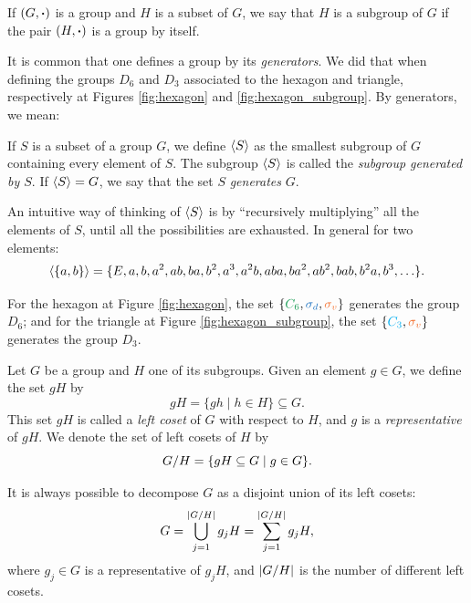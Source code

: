 \begin{definition} \label{def:subgroup}
If $(G, \vdot)$ is a group and $H$ is a subset of $G$, we say that $H$ is a subgroup of $G$ if the pair $(H, \vdot)$ is a group by itself.
\end{definition}

It is common that one defines a group by its \textit{generators}. We did that when defining the groups $D_6$ and $D_3$ associated to the hexagon and triangle, respectively at Figures \ref{fig:hexagon} and \ref{fig:hexagon_subgroup}. By generators, we mean:

\begin{definition} \label{def:generators_of_group}
If $S$ is a subset of a group $G$, we define $\ev{S}$ as the smallest subgroup of $G$ containing every element of $S$. The subgroup $\ev{S}$ is called the \textit{subgroup generated by $S$}. If $\ev{S} = G$, we say that the set $S$ \textit{generates} $G$.
\end{definition}


\begin{example} \label{ex:generators_example}
An intuitive way of thinking of $\ev{S}$ is by ``recursively multiplying'' all the elements of $S$, until all the possibilities are exhausted. In general for two elements:
\begin{equation} \label{eq:generate_two_elements}
\ev{\{a,b\}} = \{E, a, b, a^2, ab, ba, b^2, a^3, a^2b, aba, ba^2, ab^2, bab, b^2a, b^3, \ldots\}.
\end{equation}

For the hexagon at Figure \ref{fig:hexagon}, the set $\{\Cs, \sd, \sv\}$ generates the group $D_6$; and for the triangle at Figure \ref{fig:hexagon_subgroup}, the set $\{\Ct, \sv\}$ generates the group $D_3$.
\end{example}


\begin{definition} \label{def:left_cosets}
Let $G$ be a group and $H$ one of its subgroups. Given an element $g \in G$, we define the set $gH$ by
\begin{equation} \label{eq:gH_left_coset}
gH = \{g h \mid h \in H\} \subseteq G.
\end{equation}
This set $gH$ is called a \textit{left coset} of $G$ with respect to $H$, and $g$ is a \textit{representative} of $gH$. We denote the set of left cosets of $H$ by
\begin{equation} \label{eq:G/H_left_cosets}
G/H = \qty{gH \subseteq G \mid g \in G}.
\end{equation}

It is always possible to decompose $G$ as a disjoint union of its left cosets:
\begin{equation} \label{eq:disjoint_union_leftcosets}
G = \bigcup_{j=1}^{\abs{G/H}} g_j H = \sum_{j=1}^{\abs{G/H}} g_j H,
\end{equation}
where $g_j \in G$ is a representative of $g_j H$, and $\abs{G/H}$ is the number of different left cosets.
\end{definition}

